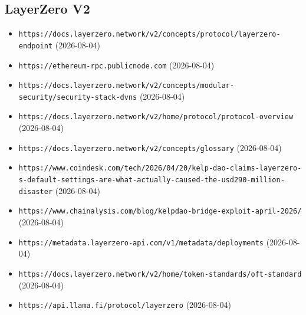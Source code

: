 \subsection*{LayerZero V2}
\begin{itemize}\setlength{\itemsep}{0pt}\small
\item \texttt{https://docs.layerzero.network/v2/concepts/protocol/layerzero-endpoint} (2026-08-04)
\item \texttt{https://ethereum-rpc.publicnode.com} (2026-08-04)
\item \texttt{https://docs.layerzero.network/v2/concepts/modular-security/security-stack-dvns} (2026-08-04)
\item \texttt{https://docs.layerzero.network/v2/home/protocol/protocol-overview} (2026-08-04)
\item \texttt{https://docs.layerzero.network/v2/concepts/glossary} (2026-08-04)
\item \texttt{https://www.coindesk.com/tech/2026/04/20/kelp-dao-claims-layerzero-s-default-settings-are-what-actually-caused-the-usd290-million-disaster} (2026-08-04)
\item \texttt{https://www.chainalysis.com/blog/kelpdao-bridge-exploit-april-2026/} (2026-08-04)
\item \texttt{https://metadata.layerzero-api.com/v1/metadata/deployments} (2026-08-04)
\item \texttt{https://docs.layerzero.network/v2/home/token-standards/oft-standard} (2026-08-04)
\item \texttt{https://api.llama.fi/protocol/layerzero} (2026-08-04)
\end{itemize}

